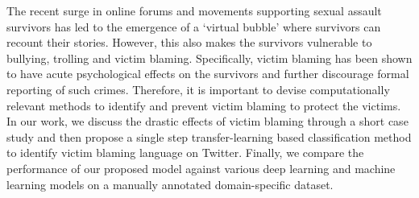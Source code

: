 The recent surge in online forums and movements supporting sexual assault survivors has led to the emergence of a  `virtual bubble' where survivors can recount their stories. However, this also makes the survivors vulnerable to bullying, trolling and victim blaming. Specifically, victim blaming has been shown to have acute psychological effects on the survivors and further discourage formal reporting of such crimes. Therefore, it is important to devise computationally relevant methods to identify and prevent victim blaming to protect the victims. In our work, we discuss the drastic effects of victim blaming through a short case study and then propose a single step transfer-learning based classification  method to identify victim blaming language on Twitter. Finally, we compare the performance of our proposed model against various deep learning and machine learning models on a manually annotated domain-specific dataset.
